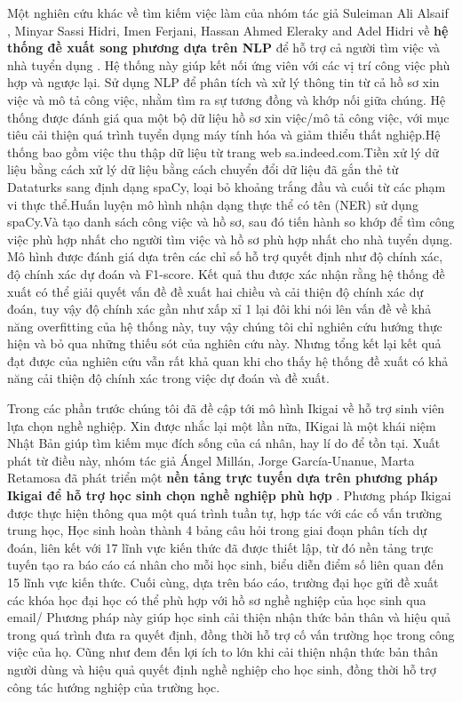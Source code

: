 Một nghiên cứu khác về tìm kiếm việc làm của nhóm tác giả Suleiman Ali Alsaif , Minyar Sassi Hidri, Imen Ferjani, Hassan Ahmed Eleraky and Adel Hidri về \textbf{hệ thống đề xuất song phương dựa trên NLP} để hỗ trợ cả người tìm việc và nhà tuyển dụng \cite{suleiman}. Hệ thống này giúp kết nối ứng viên với các vị trí công việc phù hợp và ngược lại.  Sử dụng NLP để phân tích và xử lý thông tin từ cả hồ sơ xin việc và mô tả công việc, nhằm tìm ra sự tương đồng và khớp nối giữa chúng. Hệ thống được đánh giá qua một bộ dữ liệu hồ sơ xin việc/mô tả công việc, với mục tiêu cải thiện quá trình tuyển dụng máy tính hóa và giảm thiểu thất nghiệp.Hệ thống bao gồm việc thu thập dữ liệu từ trang web sa.indeed.com.Tiền xử lý dữ liệu bằng cách xử lý dữ liệu bằng cách chuyển đổi dữ liệu đã gắn thẻ từ Dataturks sang định dạng spaCy, loại bỏ khoảng trắng đầu và cuối từ các phạm vi thực thể.Huấn luyện mô hình nhận dạng thực thể có tên (NER) sử dụng spaCy.Và tạo danh sách công việc và hồ sơ, sau đó tiến hành so khớp để tìm công việc phù hợp nhất cho người tìm việc và hồ sơ phù hợp nhất cho nhà tuyển dụng. Mô hình được đánh giá dựa trên các chỉ số hỗ trợ quyết định như độ chính xác, độ chính xác dự đoán và F1-score. Kết quả thu được xác nhận rằng hệ thống đề xuất có thể giải quyết vấn đề đề xuất hai chiều và cải thiện độ chính xác dự đoán, tuy vậy độ chính xác gần như xấp xỉ 1 lại đôi khi nói lên vấn đề về khả năng overfitting của hệ thống này, tuy vậy chúng tôi chỉ nghiên cứu hướng thực hiện và bỏ qua những thiếu sót của nghiên cứu này. Nhưng tổng kết lại kết quả đạt được của nghiên cứu vẫn rất khả quan khi  cho thấy hệ thống đề xuất có khả năng cải thiện độ chính xác trong việc dự đoán và đề xuất.

Trong các phần trước chúng tôi đã đề cập tới mô hình Ikigai về hỗ trợ sinh viên lựa chọn nghề nghiệp. Xin được nhắc lại một lần nữa, IKigai là một khái niệm Nhật Bản giúp tìm kiếm mục đích sống của cá nhân, hay lí do để tồn tại. Xuất phát từ điều này, nhóm tác giả Ángel Millán, Jorge García-Unanue, Marta Retamosa đã phát triển một\textbf{ nền tảng trực tuyến dựa trên phương pháp Ikigai để hỗ trợ học sinh chọn nghề nghiệp phù hợp} \cite{angel}. Phương pháp Ikigai được thực hiện thông qua một quá trình tuần tự, hợp tác với các cố vấn trường trung học, Học sinh hoàn thành 4 bảng câu hỏi trong giai đoạn phân tích dự đoán, liên kết với 17 lĩnh vực kiến thức đã được thiết lập, từ đó nền tảng trực tuyến tạo ra báo cáo cá nhân cho mỗi học sinh, biểu diễn điểm số liên quan đến 15 lĩnh vực kiến thức. Cuối cùng, dựa trên báo cáo, trường đại học gửi đề xuất các khóa học đại học có thể phù hợp với hồ sơ nghề nghiệp của học sinh qua email/ Phương pháp này giúp học sinh cải thiện nhận thức bản thân và hiệu quả trong quá trình đưa ra quyết định, đồng thời hỗ trợ cố vấn trường học trong công việc của họ. Cũng như đem đến lợi ích to lớn khi cải thiện nhận thức bản thân người dùng và hiệu quả quyết định nghề nghiệp cho học sinh, đồng thời hỗ trợ công tác hướng nghiệp của trường học.

